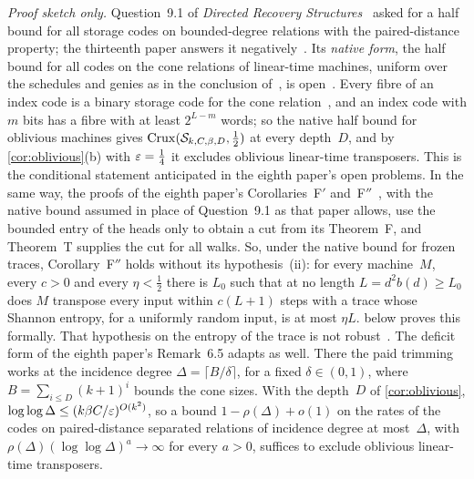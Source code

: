 \begin{remark}\label{rem:native}
\emph{Proof sketch only.} Question~9.1 of \emph{Directed Recovery Structures}~\cite{DirectedRecovery2026} asked for a half
bound for all storage codes on bounded-degree relations with the paired-distance property; the thirteenth paper answers it
negatively~\cite[Theorem~A and Corollary~A$'$]{StorageCodes2026}. Its \emph{native form}, the half bound for all codes on the
cone relations of linear-time machines, uniform over the schedules and genies as in the conclusion
of~\cite[Proposition~9.2]{DirectedRecovery2026}, is open~\cite[Problem~10.3]{EighthPaper2026}. Every fibre of an index code is a
binary storage code for the cone relation~\cite[Remark~4.9(b)]{FourthPaper2026}, and an index code with $m$ bits has a fibre with
at least $2^{L-m}$ words; so the native half bound for oblivious machines gives $\mathrm{Crux}(\mathcal S_{k,C,\beta,D},\frac12)$ at every
depth~$D$, and by \cref{cor:oblivious}(b) with $\varepsilon=\frac14$ it excludes oblivious linear-time transposers. This is the
conditional statement anticipated in the eighth paper's open problems. In the same way, the proofs of the eighth paper's
Corollaries~F$'$ and~F$''$~\cite[Corollaries~6.3 and~6.4]{EighthPaper2026}, with the native bound assumed in place of
Question~9.1 as that paper allows, use the bounded entry of the heads only to obtain a cut from its Theorem~F, and Theorem~T
supplies the cut for all walks. So, under the native bound for frozen traces, Corollary~F$''$ holds without its
hypothesis~(ii): for every machine~$M$, every $c>0$ and every $\eta<\frac12$ there is $L_0$ such that at no length
$L=d^2b(d)\ge L_0$ does $M$ transpose every input within $c(L+1)$ steps with a trace whose Shannon entropy, for a uniformly
random input, is at most $\eta L$.  below proves this formally. That hypothesis on the entropy of the trace is not robust~\cite[Section~6.2]{EighthPaper2026}.
The deficit form of the eighth paper's Remark~6.5 adapts as well. There the paid trimming works at the incidence degree
$\Delta=\lceil B/\delta\rceil$, for a fixed $\delta\in(0,1)$, where $B=\sum_{i\le D}(k+1)^i$ bounds the cone sizes. With the
depth~$D$ of \cref{cor:oblivious}, $\log\log\Delta\le(k\beta C/\varepsilon)^{O(k^2)}$, so a bound $1-\rho(\Delta)+o(1)$ on the rates of
the codes on paired-distance separated relations of incidence degree at most~$\Delta$, with
$\rho(\Delta)(\log\log\Delta)^a\to\infty$ for every $a>0$, suffices to exclude oblivious linear-time transposers.
\end{remark}

